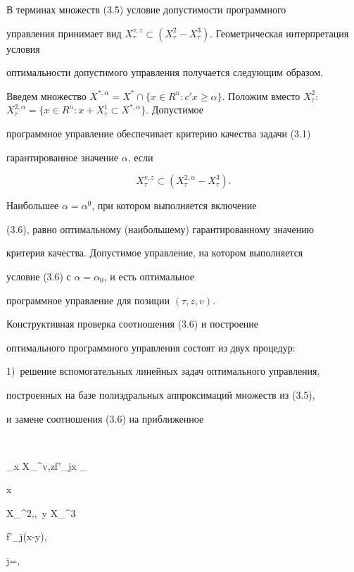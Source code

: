 В терминах множеств (3.5) условие допустимости программного


управления принимает вид $X_{\tau}^{v,z} \subset


(X_{\tau}^2-X_{\tau}^3)$. Геометрическая интерпретация условия


оптимальности допустимого управления получается следующим образом.


Введем множество $X^{*,\alpha}=X^{*}\cap\{x \in R^n:c'x \ge


\alpha\}$. Положим вместо $X_{\tau}^2$: $X_{\tau}^{2,\alpha}=\{x


\in R^n: x + X_{\tau}^{1} \subset X^{*,\alpha}\}$. Допустимое


программное управление обеспечивает критерию качества задачи (3.1)


гарантированное значение $\alpha$, если


\begin{equation}


X_{\tau}^{v,z} \subset (X_{\tau}^{2,\alpha}-X_{\tau}^{3}).


\end{equation}


Наибольшее $\alpha=\alpha^{0}$, при котором выполняется включение


(3.6), равно оптимальному (наибольшему) гарантированному значению


критерия качества. Допустимое управление, на котором выполняется


условие (3.6) с $\alpha=\alpha_{0}$, и есть оптимальное


программное управление для позиции $(\tau,z,v)$.





Конструктивная проверка соотношения (3.6) и построение


оптимального программного управления состоят из двух процедур:


1)~решение вспомогательных линейных задач оптимального управления,


построенных на базе полиэдральных аппроксимаций множеств из (3.5),


и замене соотношения (3.6) на приближенное


$$


\max_{x \in X_{\tau}^{v,z}}f'_{j}x \le \max_{x \in


X_{\tau}^{2,\alpha},\ y \in X_{\tau}^{3}}f'_{j}(x-y),\quad


j=,



